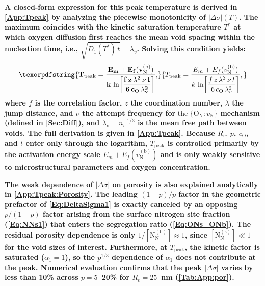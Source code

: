 \documentclass[preprint,12pt,sort&compress]{elsarticle}
\newcommand{\?}{\stackrel{?}{=}}
\providecommand{\DIFaddtex}[1]{{\bf #1}} %
\providecommand{\DIFdeltex}[1]{} %
\providecommand{\DIFaddbegin}{\protect\color{blue}} %
\providecommand{\DIFaddend}{\protect\color{black}} %
\providecommand{\DIFdelbegin}{\protect\color{red}} %
\providecommand{\DIFdelend}{\protect\color{black}} %
\providecommand{\DIFadd}[1]{\texorpdfstring{\DIFaddtex{#1}}{#1}} %
\providecommand{\DIFdel}[1]{\texorpdfstring{\DIFdeltex{#1}}{}} %
\newcommand{\DIFscaledelfig}{0.5}
\newlength{\DIFdelgraphicswidth} %
\newlength{\DIFdelgraphicsheight} %
\newcommand{\DIFaddincludegraphics}[2][]{{\color{blue}\fbox{\DIFOincludegraphics[#1]{#2}}}} %
\newcommand{\DIFdelincludegraphics}[2][]{%
\sbox{\DIFdelgraphicsbox}{\DIFOincludegraphics[#1]{#2}}%
\settoboxwidth{\DIFdelgraphicswidth}{\DIFdelgraphicsbox} %
\settoboxtotalheight{\DIFdelgraphicsheight}{\DIFdelgraphicsbox} %
\scalebox{\DIFscaledelfig}{%
\parbox[b]{\DIFdelgraphicswidth}{\usebox{\DIFdelgraphicsbox}\\[-\baselineskip] \rule{\DIFdelgraphicswidth}{0em}}\llap{\resizebox{\DIFdelgraphicswidth}{\DIFdelgraphicsheight}{%
\setlength{\unitlength}{\DIFdelgraphicswidth}%
\begin{picture}(1,1)%
\thicklines\linethickness{2pt} %
{\color[rgb]{1,0,0}\put(0,0){\framebox(1,1){}}}%
{\color[rgb]{1,0,0}\put(0,0){\line( 1,1){1}}}%
{\color[rgb]{1,0,0}\put(0,1){\line(1,-1){1}}}%
\end{picture}%
}\hspace*{3pt}}} %
} %
\DeclareRobustCommand{\DIFaddbegin}{\DIFOaddbegin \let\includegraphics\DIFaddincludegraphics} %
\DeclareRobustCommand{\DIFaddend}{\DIFOaddend \let\includegraphics\DIFOincludegraphics} %
\DeclareRobustCommand{\DIFdelbegin}{\DIFOdelbegin \let\includegraphics\DIFdelincludegraphics} %
\DeclareRobustCommand{\DIFdelend}{\DIFOaddend \let\includegraphics\DIFOincludegraphics} %
\begin{document}
\DIFadd{A closed-form expression for this peak temperature is derived in \ref{App:Tpeak} by analyzing the piecewise monotonicity of $|\Delta\sigma|(T)$. The maximum coincides with the kinetic saturation temperature $T^*$ at which oxygen diffusion first reaches the mean void spacing within the nucleation time, i.e., $\sqrt{D_1(T^*)\,t} = \lambda_v$. Solving this condition yields:
}\begin{equation}
\DIFadd{T_\text{peak} = \frac{E_m + E_f(v_\text{N}^{(\text{b})})}{k\,\ln\!\left[\dfrac{f\,z\,\lambda^2\,\nu\,t}{6\,c_\text{O}\,\lambda_v^2}\right]},
\label{Eq:TpeakMain}
}\end{equation}
\DIFadd{where $f$ is the correlation factor, $z$ the coordination number, $\lambda$ the jump distance, and $\nu$ the attempt frequency for }\DIFaddend the \DIFdelbegin \DIFdel{bulk rather than adsorb onto the void surfaces. The temperature that corresponds to the maximum surface energy reduction is the same for each stoichiometric condition, independent of porosity and oxygen concentration (\cref{Fig:500_0.05_1,Fig:1500_0.05_1,Fig:3000_5_1}).
This stems from the fact that the kinetic factors, $\alpha_i$, have no dependence on either porosity or oxygen concentration. The kinetic factors, however, depend on the average pore radius, i.e., $\alpha_i \sim 1/\lambda_v \sim 1/R_v$. As shown in \cref{Fig:1500_0.05_1,Fig:1500_0.05_10}}\DIFdelend \DIFaddbegin \DIFadd{$\{\text{O}_\text{N} \! : \! v_\text{N}\}$ mechanism (defined in \cref{Sec:Diff}), and $\lambda_v = n_v^{-1/3}$ is the mean free path between voids. The full derivation is given in \ref{App:Tpeak}. Because $R_v$}\DIFaddend , \DIFaddbegin \DIFadd{$p$, $c_\text{O}$, and $t$ enter only through the logarithm, $T_\text{peak}$ is controlled primarily by the activation energy scale $E_m + E_f(v_\text{N}^{(\text{b})})$ and is only weakly sensitive to microstructural parameters and oxygen concentration.
}

\DIFadd{The weak dependence of $|\Delta\sigma|$ on porosity is also explained analytically in \ref{App:Tpeak:Porosity}. The leading $(1-p)/p$ factor in the geometric prefactor of \cref{Eq:DeltaSigma1} is exactly canceled by an opposing $p/(1-p)$ factor arising from the surface nitrogen site fraction (\cref{Eq:NNs1}) that enters the segregation ratio (\cref{Eq:ONs_ONb}). The residual porosity dependence is only $1/[\text{N}_\text{N}^{(\text{b})}] \approx 1$, since $[\text{N}_\text{N}^{(\text{s})}] \ll 1$ for the void sizes of interest. Furthermore, at $T_\text{peak}$, the kinetic factor is saturated ($\alpha_1 = 1$), so the $p^{1/3}$ dependence of $\alpha_1$ does not contribute at the peak. Numerical evaluation confirms that the peak $|\Delta\sigma|$ varies by less than 10\% across $p = 5$--20\% for $R_v = 25$~nm (\cref{Tab:App:por}).
}
\end{document}

